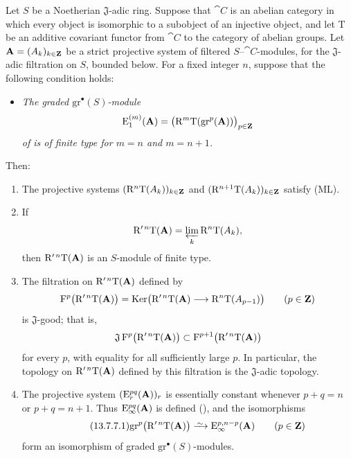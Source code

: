 \begin{proposition}[13.7.7]
\label{0.13.7.7}
Let $S$ be a Noetherian $\mathfrak{J}$-adic ring.
Suppose that $\cat{C}$ is an abelian category in which every object
is isomorphic to a subobject of an injective object, and let
$\mathrm{T}$ be an additive covariant functor from $\cat{C}$ to the
category of abelian groups.
Let $\mathbf{A}=(A_k)_{k\in\mathbf{Z}}$ be a
strict projective system of filtered $S$--$\cat{C}$-modules, for the $\mathfrak{J}$-adic
filtration on $S$, bounded below.
For a fixed integer $n$, suppose that the following condition holds:
\begin{itemize}
  \item[$(\mathrm{F}_n)$]
  \emph{The graded $\mathrm{gr}^\bullet(S)$-module}
  \[
    \mathrm{E}_1^{(m)}(\mathbf{A})
    =
    \bigl(
      \mathrm{R}^m\mathrm{T}(\mathrm{gr}^p(\mathbf{A}))
    \bigr)_{p\in\mathbf{Z}}
  \]
  \emph{of  is of finite type for
  $m=n$ and $m=n+1$.}
\end{itemize}
Then:
\begin{enumerate}
  \item[{\rm(i)}] The projective systems
  $(\mathrm{R}^n\mathrm{T}(A_k))_{k\in\mathbf{Z}}$ and
  $(\mathrm{R}^{n+1}\mathrm{T}(A_k))_{k\in\mathbf{Z}}$ satisfy {\rm(ML)}.
  \item[{\rm(ii)}] If
  \[
    \mathrm{R}'^{\,n}\mathrm{T}(\mathbf{A})
    =
    \varprojlim_k\mathrm{R}^n\mathrm{T}(A_k),
  \]
  then $\mathrm{R}'^{\,n}\mathrm{T}(\mathbf{A})$ is an $S$-module of finite
  type.
  \item[{\rm(iii)}] The filtration on
  $\mathrm{R}'^{\,n}\mathrm{T}(\mathbf{A})$ defined by
  \[
    \mathrm{F}^p\bigl(\mathrm{R}'^{\,n}\mathrm{T}(\mathbf{A})\bigr)
    =
    \operatorname{Ker}\bigl(
      \mathrm{R}'^{\,n}\mathrm{T}(\mathbf{A})
      \longrightarrow
      \mathrm{R}^n\mathrm{T}(A_{p-1})
    \bigr)
    \qquad(p\in\mathbf{Z})
  \]
  is $\mathfrak{J}$-good; that is,
  \[
    \mathfrak{J}\,
    \mathrm{F}^p\bigl(\mathrm{R}'^{\,n}\mathrm{T}(\mathbf{A})\bigr)
    \subset
    \mathrm{F}^{p+1}\bigl(\mathrm{R}'^{\,n}\mathrm{T}(\mathbf{A})\bigr)
  \]
  for every $p$, with equality for all sufficiently large $p$.
  In particular, the topology on
  $\mathrm{R}'^{\,n}\mathrm{T}(\mathbf{A})$ defined by this filtration is the
  $\mathfrak{J}$-adic topology.
  \item[{\rm(iv)}] The projective system
  $(\mathrm{E}_r^{pq}(\mathbf{A}))_r$ is essentially constant whenever
  $p+q=n$ or $p+q=n+1$.
  Thus $\mathrm{E}_\infty^{pq}(\mathbf{A})$ is defined
  (), and the isomorphisms
  \begin{equation}
  \label{0.13.7.7.1}
  \tag{13.7.7.1}
    \mathrm{gr}^p\bigl(\RR'^{\,n}\mathrm{T}(\bb{A})\bigr)
    \isoto
    \mathrm{E}_\infty^{p,n-p}(\bb{A})
    \qquad(p\in\bb{Z})
  \end{equation}
  form an isomorphism of graded
  $\mathrm{gr}^\bullet(S)$-modules.
\end{enumerate}
\end{proposition}

